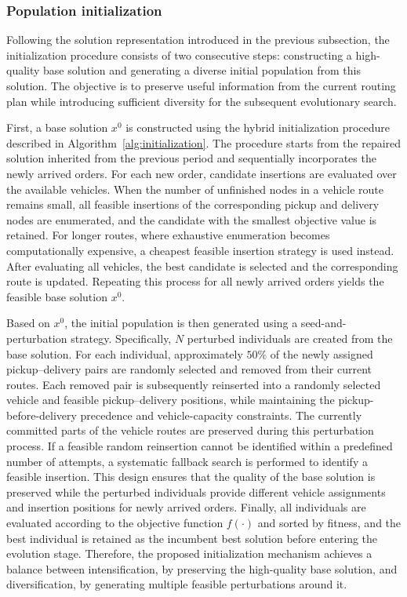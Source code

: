 \documentclass[pdflatex]{sn-jnl}
\begin{document}
\subsubsection{Population initialization}

Following the solution representation introduced in the previous subsection, the initialization procedure consists of two consecutive steps: constructing a high-quality base solution and generating a diverse initial population from 
this solution. The objective is to preserve useful information from the current routing plan while introducing sufficient diversity for the subsequent evolutionary search.

First, a base solution $x^0$ is constructed using the hybrid initialization procedure described in Algorithm~\ref{alg:initialization}. The procedure starts 
from the repaired solution inherited from the previous period and sequentially incorporates the newly arrived orders. For each new order, candidate insertions are evaluated over the available vehicles. When the number of unfinished nodes in a vehicle route remains small, all feasible insertions of the corresponding pickup and delivery nodes are enumerated, and the candidate with the smallest 
objective value is retained. For longer routes, where exhaustive enumeration becomes computationally expensive, a cheapest feasible insertion strategy is used instead. After evaluating all vehicles, the best candidate is selected and 
the corresponding route is updated. Repeating this process for all newly arrived orders yields the feasible base solution $x^0$.

Based on $x^0$, the initial population is then generated using a seed-and-perturbation strategy. Specifically, $N$ perturbed individuals are created from the base solution. For each individual, approximately $50\%$ of the newly assigned pickup--delivery pairs are randomly selected and removed from their current routes. Each removed pair is subsequently reinserted into a randomly selected vehicle and feasible pickup--delivery positions, while maintaining the pickup-before-delivery precedence and vehicle-capacity 
constraints. The currently committed parts of the vehicle routes are preserved during this perturbation process. If a feasible random reinsertion cannot be identified within a predefined number of attempts, a systematic fallback search 
is performed to identify a feasible insertion. This design ensures that the quality of the base solution is preserved while the perturbed individuals provide different vehicle assignments and insertion positions for newly arrived orders. Finally, all individuals are evaluated according to the objective 
function $f(\cdot)$ and sorted by fitness, and the best individual is retained as the incumbent best solution before entering the evolution stage. Therefore, the proposed initialization mechanism achieves a balance between intensification, by preserving the high-quality base solution, and diversification, by generating 
multiple feasible perturbations around it.
\end{document}
